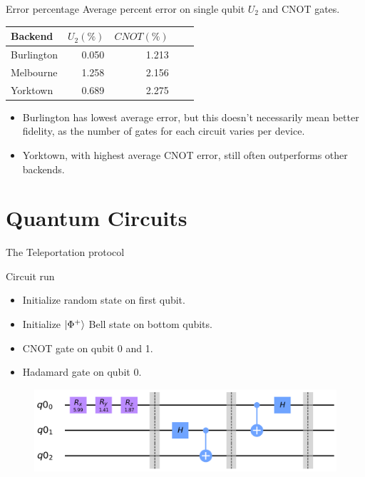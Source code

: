 \begin{frame}{Error percentage}
Average percent error on single qubit $U_2$ and CNOT gates.
\vspace{0.5cm}
\begin{table} \centering
	\begin{tabular}{lrrrr} \toprule Backend & $U_2 (\%)$ & $CNOT (\%)$ \\ \midrule
		Burlington & 0.050 & 1.213 \\ Melbourne & 1.258 & 2.156 \\ Yorktown & 0.689 &
		2.275 \\ \bottomrule
	\end{tabular}
	\label{tb:average_errors}
\end{table}
\vspace{0.5cm}
\begin{itemize}
  \item Burlington has lowest average error, but this doesn't necessarily mean
better fidelity, as the number of gates for each circuit varies per device.
  \item Yorktown, with highest average CNOT error, still often outperforms other
backends.
\end{itemize}
\end{frame}

\section{Quantum Circuits}

\begin{frame}{The Teleportation protocol}
	
	\begin{block}{Circuit run}
		\begin{itemize}
			\item Initialize random state on first qubit.
			\item Initialize $\ket{\Phi^+}$ Bell state on bottom qubits.
			\item CNOT gate on qubit 0 and 1.
			\item Hadamard gate on qubit 0.
		\end{itemize}
	\end{block}
	
	\begin{figure}[h] \centering
		\includegraphics[width=\textwidth]{images/teleport_circuit.png}
		\label{fig:tele_circ}
	\end{figure}

\end{frame}

